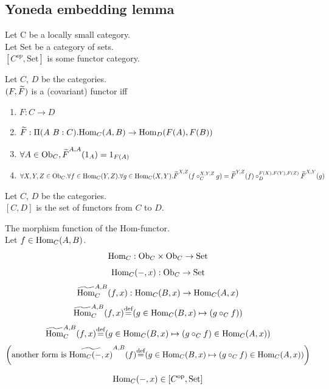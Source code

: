 \documentclass[10pt,a4paper]{article}
\begin{document}
\subsection{Yoneda embedding lemma}
Let C be a locally small category.\\
Let Set be a category of sets.\\
$[C^{op},\textrm{Set}]$ is some functor category.\\

\begin{definition}
Let $C$, $D$ be the categories.\\
 $(F, {\widetilde{F}\textrm{}})$ is a (covariant) functor iff\\
\begin{enumerate}
\item $F:C \to D$
\item ${\widetilde{F}\textrm{}}:\Pi(A\ B:C).{\textrm{Hom}}_C(A,B) \to {\textrm{Hom}}_D(F(A), F(B))$
\item $\forall A\in {\textrm{Ob}}_C, {\widetilde{F}\textrm{}}^{A,A}(1_A)=1_{F(A)}$
\item $\forall X,Y,Z \in {\textrm{Ob}}_C.\forall f\in{\textrm{Hom}}_C(Y,Z).\forall g\in{\textrm{Hom}}_C(X,Y). {\widetilde{F}\textrm{}}^{X,Z}(f\circ_C^{X,Y,Z} g)={\widetilde{F}\textrm{}}^{Y,Z}(f)\circ_D^{F(X),F(Y),F(Z)} {\widetilde{F}\textrm{}}^{X,Y}(g)$
\end{enumerate}

\end{definition}

\begin{definition}
Let $C$, $D$ be the categories.\\
$[C,D]$ is the set of functors from $C$ to $D$.\\
\end{definition}

\begin{definition} The morphism function of the Hom-functor.\\
Let $f\in{\textrm{Hom}}_{C}(A,B)$.
$${\textrm{Hom}}_C: {\textrm{Ob}}_C \times {\textrm{Ob}}_C \to {\textrm{Set}}$$
$${\textrm{Hom}}_C(-,x): {\textrm{Ob}}_C \to {\textrm{Set}}$$
$${\widetilde{{\textrm{Hom}}}\textrm{}}^{A,B}_C(f,x) : {\textrm{Hom}}_C(B,x) \to {\textrm{Hom}}_C(A,x)$$
$${\widetilde{{\textrm{Hom}}}\textrm{}}^{A,B}_C(f,x) {\stackrel{{\textrm{def}}}{=}} (g \in{\textrm{Hom}}_C(B,x) \mapsto (g \circ_C f))$$
$${\widetilde{{\textrm{Hom}}}\textrm{}}^{A,B}_C(f,x) {\stackrel{{\textrm{def}}}{=}} (g \in{\textrm{Hom}}_C(B,x) \mapsto (g \circ_C f) \in{\textrm{Hom}}_C(A,x))$$
$$\left(\textrm{another form is }\widetilde{{\textrm{Hom}}_C(-,x)}^{A,B}(f) {\stackrel{{\textrm{def}}}{=}} (g \in{\textrm{Hom}}_C(B,x) \mapsto (g \circ_C f) \in{\textrm{Hom}}_C(A,x))\right)$$
\end{definition}

\begin{lemma}
$${\textrm{Hom}}_C(-, x) \in [C^{\textrm{op}},{\textrm{Set}}]$$
\end{lemma}
\end{document}
